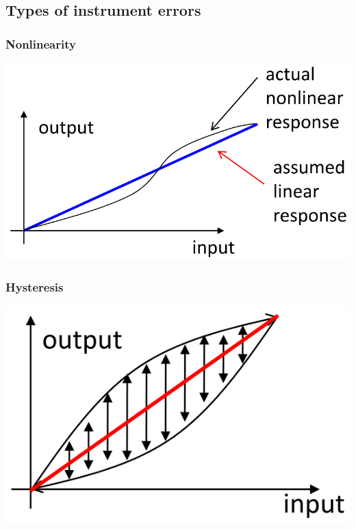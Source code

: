 \documentclass[11pt]{article}
\begin{document}
\subsection{Types of instrument errors}
\label{sec:org679a63a}

\subsubsection{Nonlinearity}
\label{sec:org664c960}
\begin{center}
\includegraphics[width=.9\linewidth]{./images/instrument-error-nonlinearity.png}
\end{center}
\subsubsection{Hysteresis}
\label{sec:org0165736}
\begin{center}
\includegraphics[width=.9\linewidth]{./images/instrument-error-hysteresis.png}
\end{center}
\end{document}
